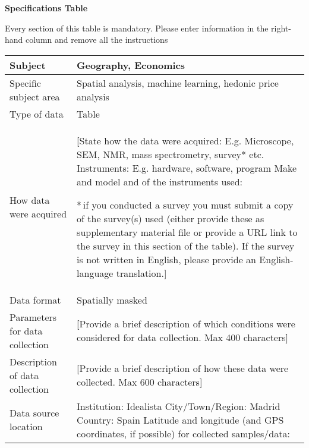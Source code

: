 \documentclass[times,final]{elsarticle}
\begin{document}

{\fontsize{7.5pt}{9pt}\selectfont
\noindent\textbf{Specifications Table}

Every section of this table is mandatory.
Please enter information in the right-hand column and remove all the instructions
\begin{longtable}{|p{33mm}|p{94mm}|}
\hline
\endhead
\hline
\endfoot
Subject                & Geography, Economics\\
\hline
Specific subject area  & Spatial analysis, machine learning, hedonic price analysis\\
\hline
Type of data           & Table\newline\\
How data were acquired & [State how the data were acquired: E.g. Microscope,
                         SEM, NMR, mass spectrometry, survey* etc.\newline
                         Instruments: E.g. hardware, software, program\newline
                         Make and model and of the instruments used:\newline

                         {\fontsize{7pt}{8pt}\selectfont
                         *\,if you conducted a survey you must submit a copy of the
                         survey(s) used (either provide these as supplementary material
                         file or provide a URL link to the survey
                         in this section of the table).
                         If the survey is not written in English,
                         please provide an English-language translation.}]\\
\hline
Data format            & Spatially masked\\
\hline
Parameters for
data\newline
collection             & [Provide a brief description of which conditions were considered
                         for data collection. Max 400 characters]\\

\hline
Description of
data\newline
collection             & [Provide a brief description of how these data were collected.
                         Max 600 characters]\\
\hline
Data source location   & Institution: Idealista\newline
                         City/Town/Region: Madrid\newline
                         Country: Spain\newline
                         Latitude and longitude (and GPS coordinates, if possible) for collected samples/data:\newline



\end{longtable}}
\end{document}
